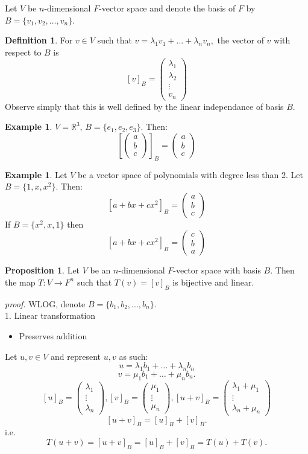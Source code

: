 \documentclass{report}
\theoremstyle{remark}
\theoremstyle{definition}
\newtheorem{definition}[theorem]{Definition}
\theoremstyle{definition}
\newtheorem{example}[theorem]{Example}
\theoremstyle{theorem}
\newtheorem{proposition}[theorem]{Proposition}
\begin{document}
Let $V$ be $n$-dimensional $F$-vector space and denote the basis of $F$ by $B = \{v_1,v_2,\ldots,v_n\}$.
\begin{definition}
    For $v\in V$ such that $v = \lambda_1v_1+\ldots+\lambda_nv_n,$ the vector of $v$ with respect to $B$ is $$[v]_B = \begin{pmatrix}\lambda_1 \\ \lambda_2 \\ \vdots \\ v_n\end{pmatrix}$$ Observe simply that this is well defined by the linear independance of basis $B$.
\end{definition}
\begin{example}
    $V = \mathbb{R}^3$, $B = \{e_1,e_2,e_3\}$. Then: $$[\begin{pmatrix}a\\b\\c\end{pmatrix}]_B = \begin{pmatrix}a\\b\\c\end{pmatrix}$$
\end{example}
\begin{example}
    Let $V$ be a vector space of polynomials with degree less than 2. Let $B = \{1,x,x^2\}$. Then: $$[a+bx+cx^2]_B = \begin{pmatrix} a\\b\\c\end{pmatrix}$$
    If $B = \{x^2,x,1\}$ then $$[a + bx +cx^2]_B = \begin{pmatrix} c\\b\\a\end{pmatrix}$$
\end{example}
\begin{proposition}
    Let $V$ be an $n$-dimensional $F$-vector space with basis $B$. Then the map $T:V\rightarrow F^n$ such that $T(v) = [v]_B$ is bijective and linear.
\end{proposition}
\emph{proof.} WLOG, denote $B = \{b_1,b_2,...,b_n\}$. \\
1. Linear transformation
\begin{itemize}
    \item Preserves addition
\end{itemize}
Let $u,v\in V$ and represent $u,v$ as such: $$u = \lambda_1 b_1+\ldots + \lambda_nb_n$$ $$v = \mu_1b_1+\ldots+\mu_nb_n.$$ $$[u]_B=\begin{pmatrix}\lambda_1\\ \vdots \\ \lambda_n\end{pmatrix}, [v]_B = \begin{pmatrix}\mu_1\\ \vdots \\ \mu_n\end{pmatrix}, [u+v]_B = \begin{pmatrix}\lambda_1+\mu_1\\ \vdots \\ \lambda_n+\mu_n\end{pmatrix}$$ $$[u+v]_B = [u]_B+[v]_B.$$ i.e. $$T(u+v) = [u+v]_B = [u]_B+[v]_B = T(u) + T(v).$$
\end{document}

